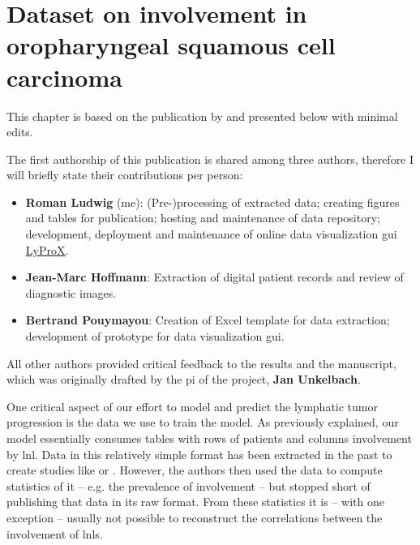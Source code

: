 \documentclass[\relativeRoot/main.tex]{subfiles}
\begin{document}
\chapter[Dataset on involvement in OPSCC]{Dataset on involvement in oropharyngeal squamous cell carcinoma}
\label{chap:dataset}

\begin{tcolorbox}[title=\faIcon{users} Contributions, parbox=false]
    This chapter is based on the publication \textbf{} by \citeauthor{ludwig_detailed_2021} \cite{ludwig_detailed_2021} and presented below with minimal edits.
    
    The first authorship of this publication is shared among three authors, therefore I will briefly state their contributions per person:

    \begin{itemize}[leftmargin=5.5mm]
        \item[\faIcon{user}] \textbf{Roman Ludwig} (me): (Pre-)processing of extracted data; creating figures and tables for publication; hosting and maintenance of data repository; development, deployment and maintenance of online data visualization \gls{gui} \href{https://lyprox.org}{ LyProX}.
        \item[\faIcon{user}] \textbf{Jean-Marc Hoffmann}: Extraction of digital patient records and review of diagnostic images.
        \item[\faIcon{user}] \textbf{Bertrand Pouymayou}: Creation of Excel template for data extraction; development of prototype for data visualization \gls{gui}.
    \end{itemize}

    All other authors provided critical feedback to the results and the manuscript, which was originally drafted by the \gls{pi} of the project, \textbf{Jan Unkelbach}.
\end{tcolorbox}

One critical aspect of our effort to model and predict the lymphatic tumor progression is the data we use to train the model. As previously explained, our model essentially consumes tables with rows of patients and columns involvement by \gls{lnl}. Data in this relatively simple format has been extracted in the past to create studies like \cite{candela_patterns_1990} or \cite{shah_patterns_1990}. However, the authors then used the data to compute statistics of it -- e.g. the prevalence of involvement -- but stopped short of publishing that data in its raw format. From these statistics it is -- with one exception \cite{sanguineti_defining_2009} -- usually not possible to reconstruct the correlations between the involvement of \glspl{lnl}.
\end{document}
